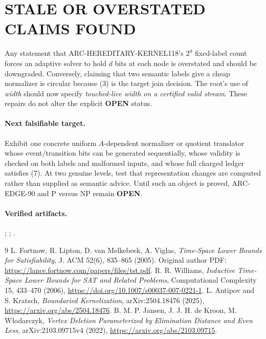 \documentclass[11pt]{article}
\newcommand{\OPEN}{\textbf{OPEN}}
\begin{document}
\section{STALE OR OVERSTATED CLAIMS FOUND}
Any statement that ARC-HEREDITARY-KERNEL118's $2^d$ fixed-label count forces
an adaptive solver to hold $d$ bits at each node is overstated and should be
downgraded.  Conversely, claiming that two semantic labels give a cheap
normalizer is circular because (3) is the target join decision.  The root's
use of \emph{width} should now specify \emph{touched-live width on a certified
valid stream}.  These repairs do not alter the explicit \OPEN{} status.

\paragraph{Next falsifiable target.}
Exhibit one concrete uniform $A$-dependent normalizer or quotient translator
whose event/transition bits can be generated sequentially, whose validity is
checked on both labels and malformed inputs, and whose full charged ledger
satisfies (7).  At two genuine levels, test that representation changes are
computed rather than supplied as semantic advice.  Until such an object is
proved, ARC-EDGE-90 and P versus NP remain \OPEN.

\paragraph{Verified artifacts.}
;
;
.

\begin{thebibliography}{9}
 L. Fortnow, R. Lipton, D. van Melkebeek, A. Viglas,
\emph{Time-Space Lower Bounds for Satisfiability}, J. ACM 52(6),
835--865 (2005). Original author PDF:
\url{https://lance.fortnow.com/papers/files/tst.pdf}.
 R. R. Williams,
\emph{Inductive Time-Space Lower Bounds for SAT and Related Problems},
Computational Complexity 15, 433--470 (2006),
\url{https://doi.org/10.1007/s00037-007-0221-1}.
 L. Antipov and S. Kratsch,
\emph{Boundaried Kernelization}, arXiv:2504.18476 (2025),
\url{https://arxiv.org/abs/2504.18476}.
 B. M. P. Jansen, J. J. H. de Kroon, M. W\l{}odarczyk,
\emph{Vertex Deletion Parameterized by Elimination Distance and Even Less},
arXiv:2103.09715v4 (2022),
\url{https://arxiv.org/abs/2103.09715}.
\end{thebibliography}
\end{document}
